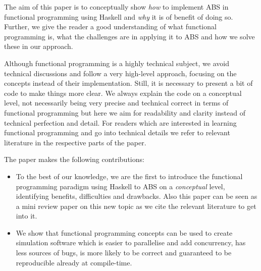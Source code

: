 The aim of this paper is to conceptually show \textit{how} to implement ABS in functional programming using Haskell and \textit{why} it is of benefit of doing so. Further, we give the reader a good understanding of what functional programming is, what the challenges are in applying it to ABS and how we solve these in our approach. 

Although functional programming is a highly technical subject, we avoid technical discussions and follow a very high-level approach, focusing on the concepts instead of their implementation. Still, it is necessary to present a bit of code to make things more clear. We always explain the code on a conceptual level, not necessarily being very precise and technical correct in terms of functional programming but here we aim for readability and clarity instead of technical perfection and detail. For readers which are interested in learning functional programming and go into technical details we refer to relevant literature in the respective parts of the paper.

The paper makes the following contributions:

\begin{itemize}
	\item To the best of our knowledge, we are the first to introduce the functional programming paradigm using Haskell to ABS on a \textit{conceptual} level, identifying benefits, difficulties and drawbacks. Also this paper can be seen as a mini review paper on this new topic as we cite the relevant literature to get into it.
	\item We show that functional programming concepts can be used to create simulation software which is easier to parallelise and add concurrency, has less sources of bugs, is more likely to be correct and guaranteed to be reproducible already at compile-time.
\end{itemize}